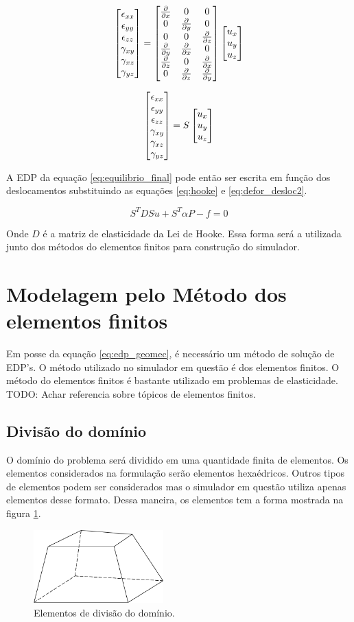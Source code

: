 \begin{equation}
\label{eq:defor_desloc}
\begin{bmatrix} \epsilon_{xx} \\ \epsilon_{yy} \\ \epsilon_{zz} \\ \gamma_{xy} \\ \gamma_{xz} \\ \gamma_{yz} \end{bmatrix} = \begin{bmatrix} \frac{\partial { }}{\partial x} & 0 & 0 \\ 0 & \frac{\partial { }}{\partial y} & 0 \\ 0 & 0 & \frac{\partial { }}{\partial z} \\ \frac{\partial { }}{\partial y} & \frac{\partial { }}{\partial x} & 0 \\ \frac{\partial { }}{\partial z} & 0 & \frac{\partial { }}{\partial x} \\ 0 & \frac{\partial { }}{\partial z} & \frac{\partial { }}{\partial y} \end{bmatrix} \begin{bmatrix} u_x \\ u_y \\ u_z \end{bmatrix}
\end{equation}

\begin{equation}
\label{eq:defor_desloc2}
\begin{bmatrix} \epsilon_{xx} \\ \epsilon_{yy} \\ \epsilon_{zz} \\ \gamma_{xy} \\ \gamma_{xz} \\ \gamma_{yz} \end{bmatrix} = S \begin{bmatrix} u_x \\ u_y \\ u_z \end{bmatrix}
\end{equation}

A EDP da equação \ref{eq:equilibrio_final} pode então ser escrita em função dos deslocamentos substituindo as equações \ref{eq:hooke} e \ref{eq:defor_desloc2}.

\begin{equation}
\label{eq:edp_geomec}
S^TDS u + S^T\alpha P - f = 0
\end{equation}

Onde $D$ é a matriz de elasticidade da Lei de Hooke. Essa forma será a utilizada junto dos métodos do elementos finitos para construção do simulador.



\section{Modelagem pelo Método dos elementos finitos}

Em posse da equação \ref{eq:edp_geomec}, é necessário um método de solução de EDP's. O método utilizado no simulador em questão é dos elementos finitos. O método do elementos finitos é bastante utilizado em problemas de elasticidade. {\color{red}TODO: Achar referencia sobre tópicos de elementos finitos.}


\subsection{Divisão do domínio}

O domínio do problema será dividido em uma quantidade finita de elementos. Os elementos considerados na formulação serão elementos hexaédricos. Outros tipos de elementos podem ser considerados mas o simulador em questão utiliza apenas elementos desse formato. Dessa maneira, os elementos tem a forma mostrada na figura \ref{fig:elemento}.


\begin{figure}[!htbp]
\label{fig:elemento}
\centering
\includegraphics[width=5cm]{chap01/elemento_original.png}
\caption{Elementos de divisão do domínio.}
\end{figure}

